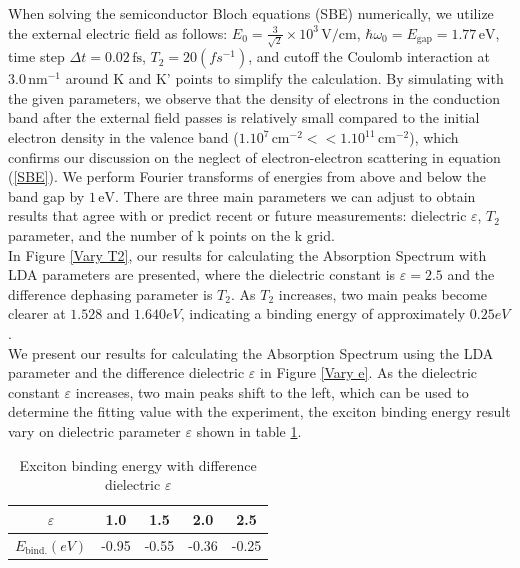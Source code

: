 \documentclass[12pt,english,a4paper]{article}
\begin{document}
\quad When solving the semiconductor Bloch equations (SBE) numerically, we utilize the external electric field as follows: \(E_0 = \frac{3}{\sqrt{2}} \times 10^3 \, \text{V/cm}\), \(\hbar \omega_0 = E_{\text{gap}} = 1.77 \, \text{eV}\), time step \(\Delta t = 0.02 \, \text{fs}\), $T_2 = 20 (fs^{-1})$, and cutoff the Coulomb interaction at \(3.0 \, \text{nm}^{-1}\) around K and K' points to simplify the calculation. By simulating with the given parameters, we observe that the density of electrons in the conduction band after the external field passes is relatively small compared to the initial electron density in the valence band (\(1.10^{7} \, \text{cm}^{-2} << 1.10^{11} \, \text{cm}^{-2}\)), which confirms our discussion on the neglect of electron-electron scattering in equation (\ref{SBE}). We perform Fourier transforms of energies from above and below the band gap by \(1 \, \text{eV}\). There are three main parameters we can adjust to obtain results that agree with or predict recent or future measurements: dielectric \(\varepsilon\), \(T_2\) parameter, and the number of k points on the k grid.\\\null
\quad In Figure \ref{Vary T2}, our results for calculating the Absorption Spectrum with LDA parameters are presented, where the dielectric constant is $\varepsilon = 2.5$ and the difference dephasing parameter is $T_2$. As $T_2$ increases, two main peaks become clearer at $1.528$ and $1.640 eV$, indicating a binding energy of approximately $0.25 eV$.\\ \null 
\quad We present our results for calculating the Absorption Spectrum using the LDA parameter and the difference dielectric $\varepsilon$ in Figure \ref{Vary e}. As the dielectric constant $\varepsilon$ increases, two main peaks shift to the left, which can be used to determine the fitting value with the experiment, the exciton binding energy result vary on dielectric parameter $\varepsilon$ shown in table \ref{Binding table}.\\\null
\begin{table}[]
	\begin{center}
		\begin{tabular}{| c | c | c | c | c|}
			\hline
			$\varepsilon$ & 1.0 & 1.5 & 2.0 & 2.5\\\hline
			$E_{\mathrm{bind.}} (eV)$ & -0.95 & -0.55 & -0.36 & -0.25\\\hline
		\end{tabular}
		\caption[Exciton binding energy with difference dielectric]{Exciton binding energy with difference dielectric $\varepsilon$}
		\label{Binding table}
	\end{center}
\end{table}
\end{document}
